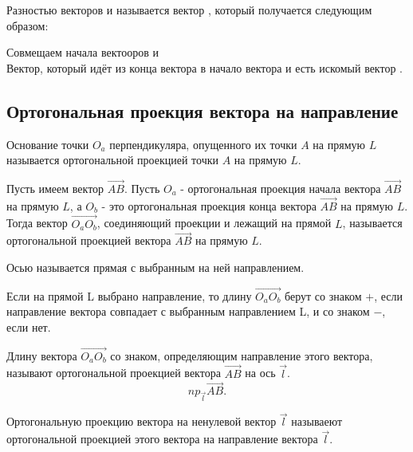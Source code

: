 \begin{definition}
  Разностью векторов  и  называется вектор , который получается следующим образом:
  \begin{enumerate}
    Совмещаем начала вектооров  и  \\
    Вектор, который идёт из конца вектора  в начало вектора  и есть искомый вектор . 
  \end{enumerate}
\end{definition}

\subsection{Ортогональная проекция вектора на направление}

\begin{definition}
  Основание точки $O_a$ перпендикуляра, опущенного их точки $A$ на прямую $L$ называется ортогональной проекцией точки $A$ на прямую $L$.
\end{definition}

\begin{definition}
  Пусть имеем вектор $\overrightarrow{AB}$. Пусть $O_a$ - ортогональная проекция начала вектора $\overrightarrow{AB}$ на прямую $L$, а $O_b$ - это ортогональная проекция конца вектора $\overrightarrow{AB}$ на прямую $L$. Тогда вектор $\overrightarrow{O_aO_b}$, соединяющий проекции и лежащий на прямой $L$, называется ортогональной проекцией вектора $\overrightarrow{AB}$ на прямую $L$.
\end{definition}

\begin{definition}
  Осью называется прямая с выбранным на ней направлением.
\end{definition}

Если на прямой L выбрано направление, то длину $\overrightarrow{O_aO_b}$ берут со знаком $+$, если направление вектора совпадает с выбранным направлением L, и со знаком  $-$, если нет.

\begin{definition}
  Длину вектора $\overrightarrow{O_aO_b}$ со знаком, определяющим направление этого вектора, называют ортогональной проекцией вектора $\overrightarrow{AB}$ на ось $\vec{l}$.
  \[
    np_{\vec{l}}\overrightarrow{AB}
  .\] 
\end{definition}

\begin{definition}
  Ортогональную проекцию вектора на ненулевой вектор $\vec{l}$ называеют ортогональной проекцией этого вектора на направление вектора $\vec{l}$.
\end{definition}

